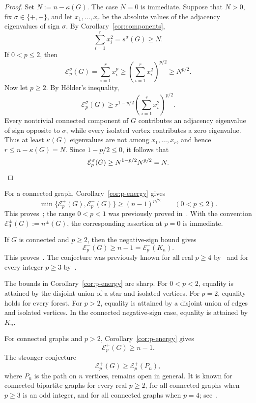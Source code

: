 \documentclass[11pt,letterpaper,reqno]{amsart}
\theoremstyle{definition}
\begin{document}
\begin{proof}
Set $N:=n-\kappa(G)$. The case $N=0$ is immediate.  Suppose that $N>0$, fix
$\sigma\in\{+,-\}$, and let $x_1,\ldots,x_r$ be the absolute values of the
adjacency eigenvalues of sign $\sigma$.  By
Corollary~\ref{cor:components},
\[
    \sum_{i=1}^r x_i^2=s^\sigma(G)\ge N.
\]
If $0<p\le2$, then
\[
    \mathcal E_p^\sigma(G)
    =\sum_{i=1}^r x_i^p
    \ge
    \left(\sum_{i=1}^r x_i^2\right)^{p/2}
    \ge N^{p/2}.
\]
Now let $p\ge2$.  By H\"older's inequality,
\[
    \mathcal E_p^\sigma(G)
    \ge
    r^{1-p/2}
    \left(\sum_{i=1}^r x_i^2\right)^{p/2}.
\]
Every nontrivial connected component of $G$ contributes an adjacency
eigenvalue of sign opposite to $\sigma$, while every isolated vertex
contributes a zero eigenvalue.  Thus at least $\kappa(G)$ eigenvalues are
not among $x_1,\ldots,x_r$, and hence $r\le n-\kappa(G)=N$. Since $1-p/2\le0$, it follows that
\[
    \mathcal E_p^\sigma(G)
    \ge
    N^{1-p/2}N^{p/2}
    =N.
\qedhere\]
\end{proof}

For a connected graph, Corollary~\ref{cor:p-energy} gives
\[
    \min\{\mathcal E_p^+(G),\mathcal E_p^-(G)\}
    \ge(n-1)^{p/2}
    \qquad (0<p\le2).
\]
This proves~\cite[Conjecture~5.4]{ETZ}; the range $0<p<1$ was previously
proved in~\cite[Theorem~5.7]{ETZ}. With the convention $\mathcal E_0^\pm(G):=n^\pm(G)$, the corresponding assertion at $p=0$ is immediate.

If $G$ is connected and $p\ge2$, then the negative-sign bound gives
\[
    \mathcal E_p^-(G)\ge n-1=\mathcal E_p^-(K_n).
\]
This proves~\cite[Conjecture~2]{AKMPp}.  The conjecture was previously known
for all real $p\ge4$ by~\cite{AKMPp} and for every integer $p\ge3$
by~\cite{CWZ}.

The bounds in Corollary~\ref{cor:p-energy} are sharp.  For $0<p<2$,
equality is attained by the disjoint union of a star and isolated vertices.
For $p=2$, equality holds for every forest.  For $p>2$, equality is attained
by a disjoint union of edges and isolated vertices.  In the connected
negative-sign case, equality is attained by $K_n$.



For connected graphs and $p>2$, Corollary~\ref{cor:p-energy} gives
\[
    \mathcal E_p^+(G)\ge n-1.
\]
The stronger conjecture
\[
    \mathcal E_p^+(G)\ge\mathcal E_p^+(P_n),
\]
where $P_n$ is the path on $n$ vertices, remains open in general.  It is
known for connected bipartite graphs for every real $p\ge2$, for all
connected graphs when $p\ge3$ is an odd integer, and for all connected
graphs when $p=4$; see~\cite{LTPath}.
\end{document}
